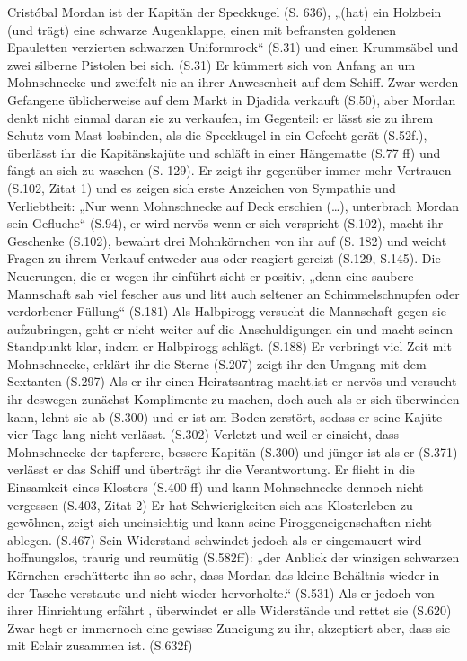 Cristóbal Mordan ist der Kapitän der Speckkugel (S. 636), „(hat) ein Holzbein (und trägt) eine schwarze Augenklappe, einen mit befransten goldenen Epauletten verzierten schwarzen Uniformrock“ (S.31) und einen  Krummsäbel und zwei silberne Pistolen bei sich. (S.31) Er kümmert sich von Anfang an um Mohnschnecke und zweifelt nie an ihrer Anwesenheit auf dem Schiff. Zwar werden Gefangene üblicherweise auf dem Markt in Djadida verkauft (S.50), aber Mordan denkt nicht einmal daran sie zu verkaufen, im Gegenteil:  er lässt sie zu ihrem Schutz vom Mast losbinden, als die Speckkugel in ein Gefecht gerät (S.52f.), überlässt ihr die Kapitänskajüte und schläft in einer Hängematte (S.77 ff) und fängt an sich zu waschen (S. 129). Er zeigt ihr gegenüber immer mehr Vertrauen (S.102, Zitat 1) und es zeigen sich erste Anzeichen von Sympathie und Verliebtheit: „Nur wenn Mohnschnecke auf Deck erschien (…), unterbrach Mordan sein Gefluche“ (S.94), er wird nervös wenn er sich verspricht (S.102), macht ihr Geschenke (S.102), bewahrt drei Mohnkörnchen von ihr auf (S. 182) und weicht Fragen zu ihrem Verkauf entweder aus oder reagiert gereizt (S.129, S.145). Die Neuerungen, die er wegen ihr einführt sieht er positiv, „denn eine saubere Mannschaft sah viel fescher aus und litt auch seltener an Schimmelschnupfen oder verdorbener Füllung“ (S.181) Als Halbpirogg versucht die Mannschaft gegen sie aufzubringen, geht er nicht weiter auf die Anschuldigungen ein und macht seinen Standpunkt klar, indem er Halbpirogg schlägt. (S.188) Er verbringt viel Zeit mit Mohnschnecke, erklärt ihr die Sterne (S.207) zeigt ihr den Umgang mit dem Sextanten (S.297) Als er ihr einen Heiratsantrag macht,ist er nervös und versucht ihr deswegen zunächst Komplimente zu machen, doch auch als er sich überwinden kann,  lehnt sie ab (S.300) und er ist am Boden zerstört, sodass er seine Kajüte vier Tage lang nicht verlässt. (S.302) Verletzt und weil er einsieht, dass Mohnschnecke der tapferere, bessere Kapitän (S.300) und jünger ist als er (S.371) verlässt er das Schiff und überträgt ihr die Verantwortung. Er flieht in die Einsamkeit eines Klosters (S.400 ff) und kann Mohnschnecke dennoch nicht vergessen (S.403, Zitat 2) Er hat Schwierigkeiten sich ans Klosterleben zu gewöhnen, zeigt sich uneinsichtig und kann seine Piroggeneigenschaften nicht ablegen. (S.467) Sein Widerstand schwindet jedoch als er eingemauert wird hoffnungslos, traurig und reumütig (S.582ff): „der Anblick der winzigen schwarzen Körnchen erschütterte ihn so sehr, dass Mordan das kleine Behältnis wieder in der Tasche verstaute und nicht wieder hervorholte.“ (S.531) Als er jedoch von ihrer Hinrichtung erfährt , überwindet er alle Widerstände und rettet sie (S.620) Zwar hegt er immernoch eine gewisse Zuneigung zu ihr, akzeptiert aber, dass sie mit Eclair zusammen ist. (S.632f)

